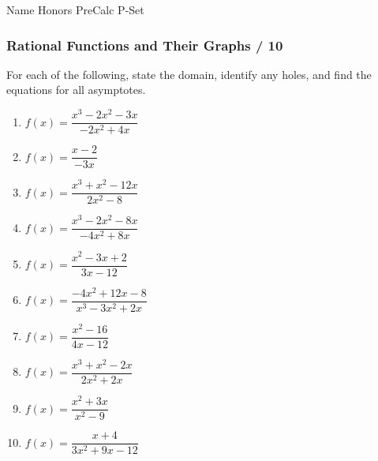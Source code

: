 \documentclass[11pt]{article}
\begin{document}
Name \makebox[2.5in]{\hrulefill} \hfill Honors PreCalc P-Set

\subsubsection*{Rational Functions and Their Graphs    \hfill  \makebox[0.35in]{\hrulefill} / 10}   

For each of the following, state the domain, identify any holes, and find the equations for all asymptotes. 
\begin{enumerate}
\item  \quad      $f(x)=\dfrac{x^3-2x^2-3x}{-2x^2+4x}$ \vfill
\item  \quad      $f(x)=\dfrac{x-2}{-3x}$ \vfill
\item  \quad      $f(x)=\dfrac{x^3+x^2-12x}{2x^2-8}$ \vfill
\item  \quad      $f(x)=\dfrac{x^3-2x^2-8x}{-4x^2+8x}$ \vfill
\item  \quad      $f(x)=\dfrac{x^2-3x+2}{3x-12}$\vfill \newpage
\item  \quad      $f(x)=\dfrac{-4x^2+12x-8}{x^3-3x^2+2x}$ \vfill
\item  \quad      $f(x)=\dfrac{x^2-16}{4x-12}$ \vfill
\item  \quad      $f(x)=\dfrac{x^3+x^2-2x}{2x^2+2x}$ \vfill
\item  \quad      $f(x)=\dfrac{x^2+3x}{x^2-9}$ \vfill
\item  \quad    $f(x)=\dfrac{x+4}{3x^2+9x-12}$ \vfill
\end{enumerate}


\newpage
\end{document}

